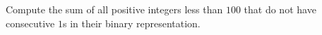 Compute the sum of all positive integers less than $100$ that do not have consecutive $1$s in their binary representation.